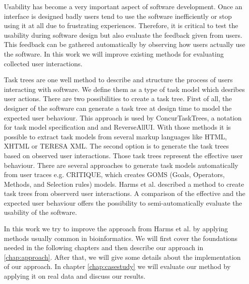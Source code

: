 Usability has become a very important aspect of software development. 
Once an interface is designed badly users tend to use the software inefficiently or stop using it at all due to frustrating experiences.
Therefore, it is critical to test the usability during software design but also evaluate the feedback given from users. 
This feedback can be gathered automatically by observing how users actually use the software.
In this work we will improve existing methods for evaluating collected user interactions.

Task trees are one well method to describe and structure the process of users interacting with software. 
We define them as a type of task model which desribes user actions. There are two possibilities to create a task tree.
First of all, the designer of the software can generate a task tree at design time to model the expected user behaviour\cite{harms2013}.
This approach is used by ConcurTaskTrees\cite{paterno2003}, a notation for task model specification and and ReverseAllUI\cite{bandelloni2008}. 
With those methods it is possible to extract task models from several markup languages like HTML, XHTML or TERESA XML.
The second option is to generate the task trees based on observed user interactions. 
Those task trees represent the effective user behaviour. 
There are several approaches to generate task models automatically from user traces e.g. CRITIQUE\cite{Hudson1999}, which creates GOMS (Goals, Operators, Methods, and Selection rules) models.
Harms et al. described a method to create task trees from observerd user interactions\cite{harms2013}.
A comparison of the effective and the expected user behaviour offers the possibility to semi-automatically evaluate the usability of the software.  

In this work we try to improve the approach from Harms et al. by applying methods usually common in bioinformatics. 
We will first cover the foundations needed in the following chapters and then describe our approach in \ref{chap:approach}. 
After that, we will give some details about the implementation of our approach. 
In chapter \ref{chap:casestudy} we will evaluate our method by applying it on real data and discuss our results.

